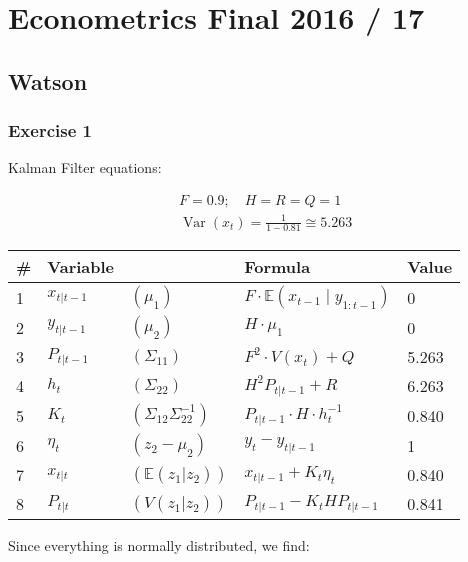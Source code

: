 \section{Econometrics Final 2016 / 17}

{
\subsection*{Watson}

{
\subsubsection*{Exercise 1}

Kalman Filter equations:

$$
\begin{aligned}
& F=0.9 ; \quad H=R=Q=1 \\
& \operatorname{Var}\left(x_{t}\right)=\frac{1}{1-0.81} \cong 5.263
\end{aligned}
$$

\begin{center}
\begin{tabular}{|l|ll|l|l|}
\hline \# & Variable & & Formula & Value \\
\hline 1 & $x_{t|t-1}$ & $\left(\mu_{1}\right)$ & $F \cdot \mathbb{E}\left(x_{t-1} \mid y_{1: t-1}\right)$ & 0 \\
2 & $y_{t|t-1}$ & $\left(\mu_{2}\right)$ & $H \cdot \mu_{1}$ & 0 \\
3 & $P_{t|t-1}$ & $\left(\Sigma_{11}\right)$ & $F^{2} \cdot V\left(x_{t}\right)+Q$ & 5.263 \\
4 & $h_{t}$ & $\left(\Sigma_{22}\right)$ & $H^{2} P_{t | t-1}+R$ & 6.263 \\
5 & $K_{t}$ & $\left(\Sigma_{12} \Sigma_{22}^{-1}\right)$ & $P_{t| t-1} \cdot H \cdot h_{t}^{-1}$ & 0.840 \\
6 & $\eta_{t}$ & $\left(z_{2}-\mu_{2}\right)$ & $y_{t}-y_{t | t-1}$ & 1 \\
7 & $x_{t|t}$ & $\left(\mathbb{E}\left(z_{1} | z_{2}\right)\right)$ & $x_{t | t-1}+K_{t} \eta_{t}$ & 0.840 \\
8 & $P_{t|t}$ & $\left(V\left(z_{1} | z_{2}\right)\right)$ & $P_{t | t-1}-K_{t} H P_{t | t-1}$ & 0.841 \\
\hline
\end{tabular}
\end{center}

\begin{enumerate}[label=(\alph*)]
{\item 
Since everything is normally distributed, we find:

}
\end{enumerate}}}
